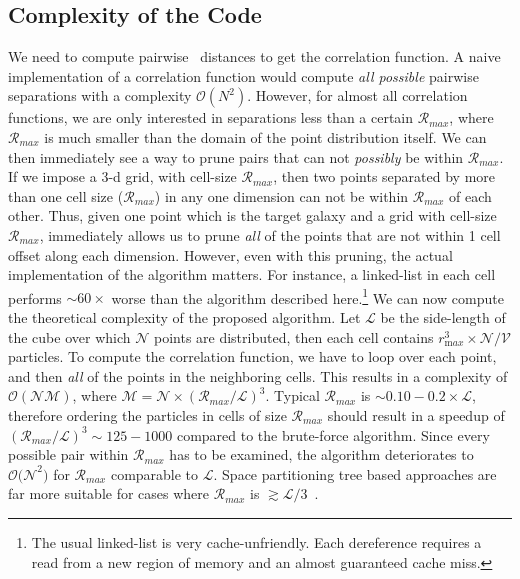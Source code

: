 \documentclass[preprint, 12pt, authoryear]{elsarticle}
\newcommand{\rmax}{\ensuremath{{{\mathcal{R}}_{max}}}\xspace}
\newcommand{\lbox}{\ensuremath{\mathcal{L}}\xspace}
\begin{document}
\subsection{Complexity of the Code}
We need to compute pairwise~\citep{} distances to get the correlation function. A naive implementation of a correlation function would compute {\em all possible} 
pairwise separations with a complexity $\mathcal{O}(N^2)$. However, for almost all correlation functions, we are only interested in separations less than 
a certain \rmax, where \rmax is much smaller than the domain of the point distribution itself. We can then immediately see a way to prune pairs that can not
{\em possibly} be within \rmax. If we impose a 3-d grid, with cell-size \rmax, then two points separated by more than one cell size (\rmax) in any one 
dimension can not be within \rmax of each other. Thus, given one point which is the target galaxy and a grid with cell-size \rmax, 
immediately allows us to prune {\em all} of the points that are not within 1 cell offset along each dimension. However, even with this pruning, the actual 
implementation of the algorithm matters. For instance, a linked-list in each cell performs $\sim 60\times$ worse than the algorithm described here.\footnote{The 
usual linked-list is very cache-unfriendly. Each dereference requires a read
from a new region of memory and an almost guaranteed cache miss. } 
We can now compute the theoretical complexity of the proposed algorithm. Let
\lbox be the side-length of the cube over which $\mathcal{N}$ points are distributed, then
each cell contains $r_{\mathrm max}^3\times \mathcal{N/V}$ particles. To compute the
correlation function, we have to loop over each point, and then {\em all} of
the points in the neighboring cells. This results in a complexity of 
$\mathcal{O(NM)}$, where $\mathcal{M} = \mathcal{N}\times\left(\rmax/\lbox\right)^3$. Typical \rmax is $\sim 0.10-0.2\times
\lbox$, therefore ordering the particles in cells of size \rmax should
result in a speedup of $(\rmax/\lbox)^3 \sim 125-1000$ compared to the
brute-force algorithm. Since every possible pair within \rmax has to be
examined, the algorithm deteriorates to $\mathcal{O(N}^2)$ for \rmax comparable
to \lbox. Space partitioning tree based approaches are far more suitable for
cases where \rmax is $\gtrsim \lbox/3$~\citep[e.g.,][]{mlpack2013,
  feng_kdcount}. 
\end{document}
